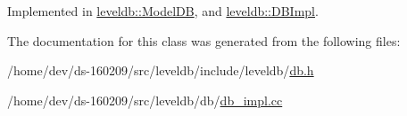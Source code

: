 Implemented in \hyperlink{classleveldb_1_1_model_d_b_ae3a20d2fc971376349b142b9c2d159be}{leveldb\+::\+Model\+D\+B}, and \hyperlink{classleveldb_1_1_d_b_impl_ac0d0b472717099d6a02ad9dace4e8ef4}{leveldb\+::\+D\+B\+Impl}.



The documentation for this class was generated from the following files\+:\begin{DoxyCompactItemize}
\item 
/home/dev/ds-\/160209/src/leveldb/include/leveldb/\hyperlink{leveldb_2include_2leveldb_2db_8h}{db.\+h}\item 
/home/dev/ds-\/160209/src/leveldb/db/\hyperlink{db__impl_8cc}{db\+\_\+impl.\+cc}\end{DoxyCompactItemize}
